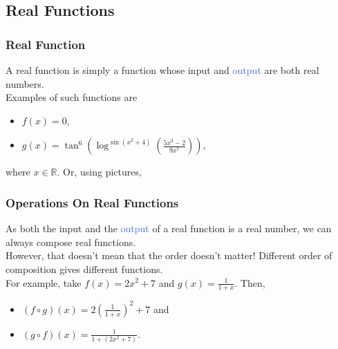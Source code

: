 \documentclass[aspectratio=169,11pt,dvipsnames,handout]{beamer}
\newcommand{\clr}{\textcolor{BrickRed}}
\newcommand{\clb}{\textcolor{RoyalBlue}}
\newcommand{\R}{\mathbb{R}}
\begin{document}
\subsection{Real Functions}

\begin{frame}
 \subsectionpage
\end{frame}

\begin{frame}
 \frametitle{Real Function}
 A \alert{real function} is simply a function whose \alert{\clr{input} and
 \clb{output} are both real numbers}. \\ \pause
 Examples of such functions are
 \begin{itemize}
  \item $f(x) = 0$,
  \item $g(x) = \tan^{6}(\log^{\sin(x^2 + 4)}(\frac{5x^3 - 2}{9x^{7}}))$,
 \end{itemize}
 where $x \in \R$. \pause Or, using pictures,
 \begin{center}
 \end{center}
\end{frame}

\begin{frame}
 \frametitle{Operations On Real Functions}
 As both the \clr{input} and the \clb{output} of a real function is a real
 number, \alert{we can always compose real functions}. \\ \pause
 However, that \alert{doesn't mean that the order doesn't matter!} Different
 order of composition gives different functions.\\ \pause
 For example, take $f(x) = 2x^2 + 7$ and $g(x) = \frac{1}{1 + x}$. Then,\pause
 \begin{itemize}
  \item $(f \circ g)(x) = 2 \left( \frac{1}{1+x} \right)^2 + 7$ and \pause
  \item $(g \circ f)(x) = \frac{1}{1 + (2x^2 + 7)}$.
 \end{itemize}
\end{frame}
\end{document}
